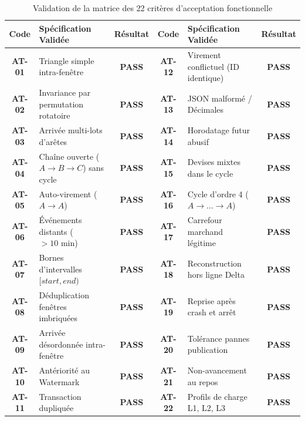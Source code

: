 \begin{table}[htbp]
\centering
\caption{Validation de la matrice des 22 critères d'acceptation fonctionnelle}
\label{tab:acceptance_tests}
\scriptsize
\setlength{\tabcolsep}{2.5pt}
\renewcommand{\arraystretch}{0.90}
\begin{tabularx}{\textwidth}{c X c | c X c}
\toprule
\textbf{Code} & \textbf{Spécification Validée} & \textbf{Résultat} & \textbf{Code} & \textbf{Spécification Validée} & \textbf{Résultat} \\
\midrule
\textbf{AT-01} & Triangle simple intra-fenêtre & \textbf{\color{emeraldSuccess}PASS} & \textbf{AT-12} & Virement conflictuel (ID identique) & \textbf{\color{emeraldSuccess}PASS} \\
\textbf{AT-02} & Invariance par permutation rotatoire & \textbf{\color{emeraldSuccess}PASS} & \textbf{AT-13} & JSON malformé / Décimales & \textbf{\color{emeraldSuccess}PASS} \\
\textbf{AT-03} & Arrivée multi-lots d'arêtes & \textbf{\color{emeraldSuccess}PASS} & \textbf{AT-14} & Horodatage futur abusif & \textbf{\color{emeraldSuccess}PASS} \\
\textbf{AT-04} & Chaîne ouverte ($A \to B \to C$) sans cycle & \textbf{\color{emeraldSuccess}PASS} & \textbf{AT-15} & Devises mixtes dans le cycle & \textbf{\color{emeraldSuccess}PASS} \\
\textbf{AT-05} & Auto-virement ($A \to A$) & \textbf{\color{emeraldSuccess}PASS} & \textbf{AT-16} & Cycle d'ordre 4 ($A \to \dots \to A$) & \textbf{\color{emeraldSuccess}PASS} \\
\textbf{AT-06} & Événements distants ($> 10\text{ min}$) & \textbf{\color{emeraldSuccess}PASS} & \textbf{AT-17} & Carrefour marchand légitime & \textbf{\color{emeraldSuccess}PASS} \\
\textbf{AT-07} & Bornes d'intervalles $[start, end)$ & \textbf{\color{emeraldSuccess}PASS} & \textbf{AT-18} & Reconstruction hors ligne Delta & \textbf{\color{emeraldSuccess}PASS} \\
\textbf{AT-08} & Déduplication fenêtres imbriquées & \textbf{\color{emeraldSuccess}PASS} & \textbf{AT-19} & Reprise après crash et arrêt & \textbf{\color{emeraldSuccess}PASS} \\
\textbf{AT-09} & Arrivée désordonnée intra-fenêtre & \textbf{\color{emeraldSuccess}PASS} & \textbf{AT-20} & Tolérance pannes publication & \textbf{\color{emeraldSuccess}PASS} \\
\textbf{AT-10} & Antériorité au Watermark & \textbf{\color{emeraldSuccess}PASS} & \textbf{AT-21} & Non-avancement au repos & \textbf{\color{emeraldSuccess}PASS} \\
\textbf{AT-11} & Transaction dupliquée & \textbf{\color{emeraldSuccess}PASS} & \textbf{AT-22} & Profils de charge L1, L2, L3 & \textbf{\color{emeraldSuccess}PASS} \\
\bottomrule
\end{tabularx}
\end{table}

